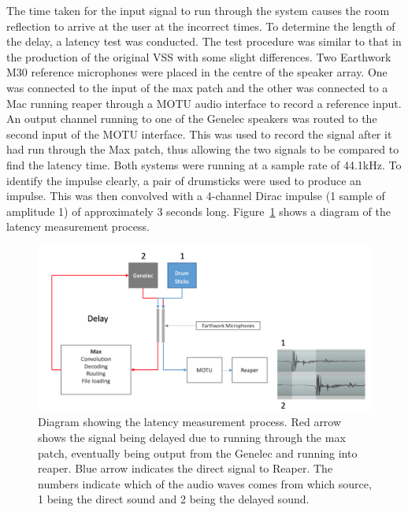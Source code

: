 \documentclass[../../main.tex]{subfiles}
\begin{document}
		The time taken for the input signal to run through the system causes the room reflection to arrive at the user at the incorrect times. To determine the length of the delay, a latency test was conducted. The test procedure was similar to that in the production of the original \ac{VSS} \cite{Brereton2014} with some slight differences. Two Earthwork M30 reference microphones \cite{earthworks} were placed in the centre of the speaker array. One was connected to the input of the max patch and the other was connected to a Mac running reaper through a MOTU audio interface \cite{motu} to record a reference input. An output channel running to one of the Genelec speakers was routed to the second input of the MOTU interface. This was used to record the signal after it had run through the Max patch, thus allowing the two signals to be compared to find the latency time. Both systems were running at a sample rate of 44.1kHz. To identify the impulse clearly, a pair of drumsticks were used to produce an impulse. This was then convolved with a 4-channel Dirac impulse (1 sample of amplitude 1) of approximately 3 seconds long. Figure~\ref{latencyDiagram} shows a diagram of the latency measurement process.

		\begin{figure}[H]
			\centerline{\includegraphics[scale = 0.4]{Sections/Implementation/Max/images/Latency/latencyDiagram.png}}
			\caption{Diagram showing the latency measurement process. Red arrow shows the signal being delayed due to running through the max patch, eventually being output from the Genelec and running into reaper. Blue arrow indicates the direct signal to Reaper. The numbers indicate which of the audio waves comes from which source, 1 being the direct sound and 2 being the delayed sound.}
			\label{latencyDiagram}
		\end{figure}
\end{document}

